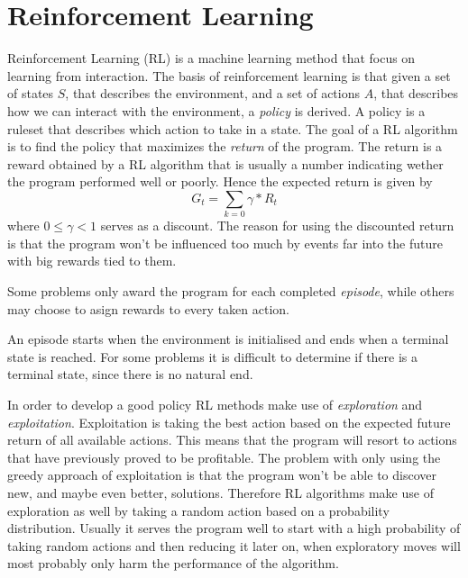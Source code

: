 \documentclass[11pt]{article}
\begin{document}
\maketitle

\section{Reinforcement Learning}

Reinforcement Learning (RL) is a machine learning method that focus on learning from interaction.
The basis of reinforcement learning is that given a set of states $S$, that describes the environment,
and a set of actions $A$, that describes how we can interact with the environment,
a \textit{policy} is derived.
A policy is a ruleset that describes which action to take in a state.
The goal of a RL algorithm is to find the policy that
maximizes the \textit{return} of the program.
The return is a reward obtained by a RL algorithm that is usually a number indicating
wether the program performed well or poorly.
Hence the expected return is given by
\begin{equation}
    G_t = \sum\limits_{k=0} \gamma * R_{t}
\end{equation}
where $0 \leq \gamma < 1$ serves as a discount.
The reason for using the discounted return is that the program won't be influenced
too much by events far into the future with big rewards tied to them.

Some problems only award the program for each completed \textit{episode},
while others may choose to asign rewards to every taken action.

An episode starts when the environment is initialised and ends when a terminal state is reached.
For some problems it is difficult to determine if there is a terminal state, since there
is no natural end.

In order to develop a good policy RL methods make use of \textit{exploration} and \textit{exploitation}.
Exploitation is taking the best action based on the expected future return of all available actions.
This means that the program will resort to actions that have previously proved to be profitable.
The problem with only using the greedy approach of exploitation is that the program won't be able
to discover new, and maybe even better, solutions.
Therefore RL algorithms make use of exploration as well by taking a random action based
on a probability distribution.
Usually it serves the program well to start with a high probability of taking random actions
and then reducing it later on, when exploratory moves will most probably only harm the
performance of the algorithm.




%
%
\end{document}
